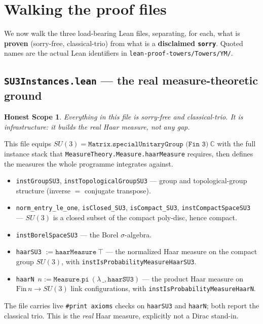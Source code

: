 \documentclass[11pt]{article}
\newtheorem*{honest}{Honest Scope}
\newcommand{\code}[1]{\texttt{#1}}
\begin{document}
\section{Walking the proof files}

We now walk the three load-bearing Lean files, separating, for each,
what is \textbf{proven} (sorry-free, classical-trio) from what is a
\textbf{disclaimed \code{sorry}}. Quoted names are the actual Lean
identifiers in \code{lean-proof-towers/Towers/YM/}.

\subsection{\code{SU3Instances.lean} --- the real measure-theoretic ground}

\begin{honest}
Everything in this file is sorry-free and classical-trio. It is
\emph{infrastructure}: it builds the real Haar measure, not any gap.
\end{honest}

This file equips $SU(3) = \code{Matrix.specialUnitaryGroup (Fin 3)}\
\mathbb{C}$ with the full instance stack that
\code{MeasureTheory.Measure.haarMeasure} requires, then defines the
measures the whole programme integrates against.

\begin{itemize}
  \item \code{instGroupSU3}, \code{instTopologicalGroupSU3} --- group
        and topological-group structure (inverse $=$ conjugate
        transpose).
  \item \code{norm\_entry\_le\_one}, \code{isClosed\_SU3},
        \code{isCompact\_SU3}, \code{instCompactSpaceSU3} --- $SU(3)$
        is a closed subset of the compact poly-disc, hence compact.
  \item \code{instBorelSpaceSU3} --- the Borel $\sigma$-algebra.
  \item \code{haarSU3} $:= \code{haarMeasure}\ \top$ --- the
        normalized Haar measure on the compact group $SU(3)$, with
        \code{instIsProbabilityMeasureHaarSU3}.
  \item \code{haarN}\ $n := \code{Measure.pi}\ (\lambda\, \_,
        \code{haarSU3})$ --- the product Haar measure on
        $\mathrm{Fin}\,n \to SU(3)$ link configurations, with
        \code{instIsProbabilityMeasureHaarN}.
\end{itemize}

The file carries live \code{\#print axioms} checks on \code{haarSU3}
and \code{haarN}; both report the classical trio. This is the
\emph{real} Haar measure, explicitly not a Dirac stand-in.
\end{document}
